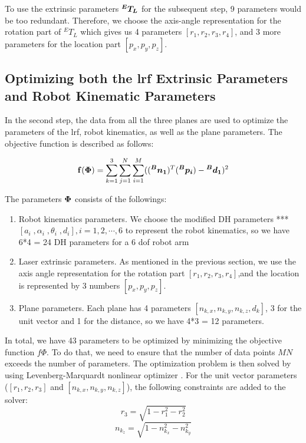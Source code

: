 To use the extrinsic parameters $\vb*{{^E}T_L}$ for the subsequent step, 9 parameters would be too redundant. Therefore, we choose the axis-angle representation for the rotation part of ${^E}T_L$ which gives us 4 parameters $[r_1, r_2, r_3, r_4]$, and 3 more parameters for the location part $[p_x, p_y, p_z]$. 


\subsection{Optimizing both the \ac{lrf} Extrinsic Parameters and Robot Kinematic Parameters}
\label{sec:second_step}
In the second step, the data from all the three planes are used to optimize the parameters of the \ac{lrf}, robot kinematics, as well as the plane parameters. The objective function is described as follows:

\begin{equation}
 \vb{f(\Phi)} =  \sum_{k=1}^{3} \sum_{j=1}^{N} \sum_{i=1}^{M} ((\vb*{{^B}n_1}) ^T (\vb*{{^B}p_i}) - \vb*{{^B}d_1})^2
\end{equation}

The parameters $\vb*{\Phi}$ consists of the followings:
\begin{enumerate}
\item Robot kinematics parameters. We choose the modified DH parameters *** $[a_i \;, \alpha_i \;,\theta_i \;,d_i], i=1, 2, \cdots ,6$ to represent the robot kinematics, so we have 6*4 = 24 DH parameters for a 6 \ac{dof} robot arm
\item Laser extrinsic parameters. As mentioned in the previous section, we use the axis angle representation for the rotation part $[r_1, r_2, r_3, r_4]$,and the location is represented by 3 numbers $[p_x, p_y, p_z]$. 
\item Plane parameters. Each plane has 4 parameters $[n_{k,x}, n_{k,y}, n_{k,z}, d_{k}]$, 3 for the unit vector and 1 for the distance, so we have 4*3 = 12 parameters. 
\end{enumerate}

In total, we have 43 parameters to be optimized by minimizing the objective function $f{\Phi}$. To do that, we need to ensure that the number of data points $MN$ exceeds the number of parameters. The optimization problem is then solved by using Levenberg-Marquardt nonlinear optimizer \cite{Newville2014}. For the unit vector parameters ($[r_1, r_2, r_3]$ and  $[n_{k,x}, n_{k,y}, n_{k,z}]$), the following constraints are added to the solver:
\begin{equation}
\label{eq:10}
r_3 = \sqrt{1 - r_1^2 - r_2^2}
\end{equation}
\begin{equation}
\label{eq:11}
n_{k_z} = \sqrt{1 - n_{k_x}^2 - n_{k_y}^2}
\end{equation}


